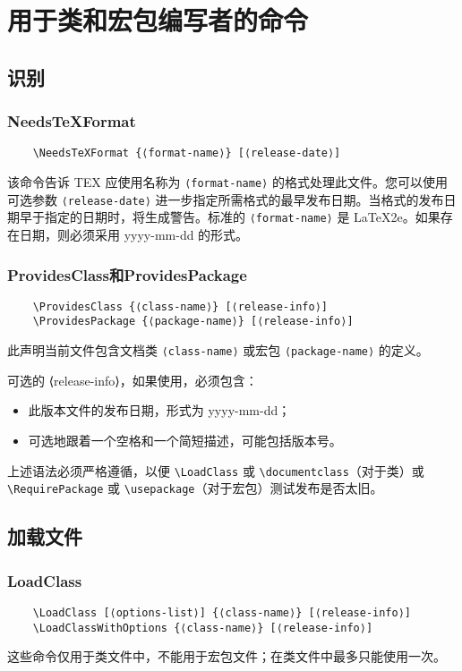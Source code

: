 \section{用于类和宏包编写者的命令}\label{sec:cls-cmd}
\subsection{识别}
\subsubsection{NeedsTeXFormat}
\begin{lstlisting}
    \NeedsTeXFormat {⟨format-name⟩} [⟨release-date⟩]
\end{lstlisting}
该命令告诉 TEX 应使用名称为 \lstinline|⟨format-name⟩| 的格式处理此文件。您可以使用可选参数 \lstinline|⟨release-date⟩| 进一步指定所需格式的最早发布日期。当格式的发布日期早于指定的日期时，将生成警告。标准的 \lstinline|⟨format-name⟩| 是 LaTeX2e。如果存在日期，则必须采用 yyyy-mm-dd 的形式。

\subsubsection{ProvidesClass和ProvidesPackage}
\begin{lstlisting}
    \ProvidesClass {⟨class-name⟩} [⟨release-info⟩]
    \ProvidesPackage {⟨package-name⟩} [⟨release-info⟩]
\end{lstlisting}
此声明当前文件包含文档类 \lstinline|⟨class-name⟩| 或宏包 \lstinline|⟨package-name⟩| 的定义。

可选的 ⟨release-info⟩，如果使用，必须包含：
\begin{itemize}
    \item 此版本文件的发布日期，形式为 yyyy-mm-dd；
    \item 可选地跟着一个空格和一个简短描述，可能包括版本号。
\end{itemize}

上述语法必须严格遵循，以便 \lstinline|\LoadClass| 或 \lstinline|\documentclass|（对于类）或 \lstinline|\RequirePackage| 或 \lstinline|\usepackage|（对于宏包）测试发布是否太旧。

\subsection{加载文件}
\subsubsection{LoadClass}
\begin{lstlisting}
    \LoadClass [⟨options-list⟩] {⟨class-name⟩} [⟨release-info⟩]
    \LoadClassWithOptions {⟨class-name⟩} [⟨release-info⟩]
\end{lstlisting}
这些命令仅用于类文件中，不能用于宏包文件；在类文件中最多只能使用一次。

